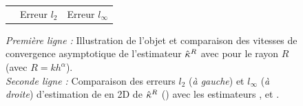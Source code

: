 \begin{figure}[ht]
\begin{center}
\begin{tabular}{@{}l c c @{}}
      \\
      &
      Erreur $l_2$ &
      Erreur $l_\infty$
    \end{tabular}
    \caption[Évaluation expérimentale sur l'objet \AccFlower.]{
      \emph{Première ligne :} Illustration de l'objet \AccFlower et comparaison
      des vitesses de convergence asymptotique de l'estimateur $\hat{\kappa}^{R}$ avec
       pour le rayon $R$ (avec $R=kh^\alpha$).
      \\
      \emph{Seconde ligne :} Comparaison des erreurs $l_2$ (\emph{à gauche}) et
      $l_\infty$ (\emph{à droite}) d'estimation de  en 2D de $\hat{\kappa}^{R}$
      (\II) avec les estimateurs \BC \cite{Esbelin2011}, \MDSS
      \cite{Coeurjolly2001,deVieilleville2007} et \MDCA \cite{Roussillon2011}.
      }
      \label{fig:curv-experiments-accflower}
  \end{center}
\end{figure}

